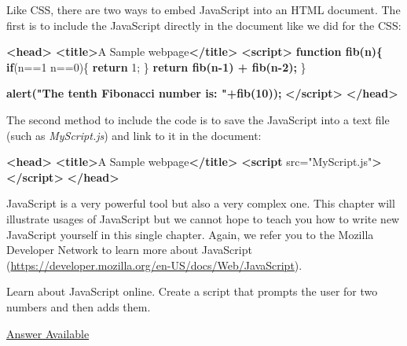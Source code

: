 \documentclass[]{memoir}
\newenvironment{Shaded}{}{}
\newcommand{\KeywordTok}[1]{\textcolor[rgb]{0.00,0.44,0.13}{\textbf{{#1}}}}
\newcommand{\DecValTok}[1]{\textcolor[rgb]{0.25,0.63,0.44}{{#1}}}
\newcommand{\StringTok}[1]{\textcolor[rgb]{0.25,0.44,0.63}{{#1}}}
\newcommand{\OtherTok}[1]{\textcolor[rgb]{0.00,0.44,0.13}{{#1}}}
\newcommand{\ErrorTok}[1]{\textcolor[rgb]{1.00,0.00,0.00}{\textbf{{#1}}}}
\newcommand{\NormalTok}[1]{{#1}}
\begin{document}
Like CSS, there are two ways to embed JavaScript into an HTML document.
The first is to include the JavaScript directly in the document like we
did for the CSS:

\begin{Shaded}
\begin{Highlighting}[]
\KeywordTok{<head>}
    \KeywordTok{<title>}\NormalTok{A Sample webpage}\KeywordTok{</title>}
    \KeywordTok{<script>}
\ErrorTok{        function fib(n)\{}
            \KeywordTok{if}\NormalTok{(n==}\DecValTok{1} \NormalTok{\textbar{}\textbar{} n==}\DecValTok{0}\NormalTok{)\{}
                \KeywordTok{return} \DecValTok{1}\NormalTok{;}
            \NormalTok{\}}
\ErrorTok{            return fib(n-1) + fib(n-2);}
        \NormalTok{\}}

\ErrorTok{        alert("The tenth Fibonacci number is: "+fib(10));}
    \KeywordTok{</script>}
\KeywordTok{</head>}
\end{Highlighting}
\end{Shaded}

The second method to include the code is to save the JavaScript into a
text file (such as \emph{MyScript.js}) and link to it in the document:

\begin{Shaded}
\begin{Highlighting}[]
\KeywordTok{<head>}
    \KeywordTok{<title>}\NormalTok{A Sample webpage}\KeywordTok{</title>}
    \KeywordTok{<script}\OtherTok{ src=}\StringTok{"MyScript.js"}\KeywordTok{></script>}
\KeywordTok{</head>}
\end{Highlighting}
\end{Shaded}

JavaScript is a very powerful tool but also a very complex one. This
chapter will illustrate usages of JavaScript but we cannot hope to teach
you how to write new JavaScript yourself in this single chapter. Again,
we refer you to the Mozilla Developer Network to learn more about
JavaScript
(\url{https://developer.mozilla.org/en-US/docs/Web/JavaScript}).


Learn about JavaScript online. Create a script that prompts the user for
two numbers and then adds them.

\hyperref[Ans-12-6]{Answer Available}
\end{document}
